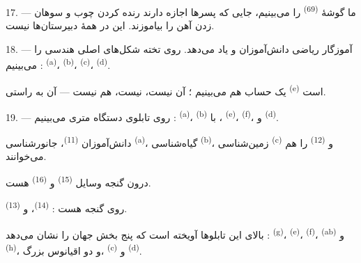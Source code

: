 17. --- ما گوشهٔ   \textsuperscript{(69)}
را می‌بینیم، جایی که پسرها اجازه دارند رنده کردن چوب و سوهان زدن آهن را
بیاموزند. این در همهٔ دبیرستان‌ها نیست.

\VUsaut{5.0mm}
\VUsaut{3.6mm}

18. --- آموزگار ریاضی  دانش‌آموزان  و  یاد می‌دهد. روی تخته شکل‌های اصلی هندسی
را می‌بینیم :  \textsuperscript{(a)}، 
\textsuperscript{(b)}،  \textsuperscript{(c)}،
 \textsuperscript{(d)}.

یک  حساب هم می‌بینیم ؛ آن  نیست،
 نیست،  هم نیست — آن به راستی 
\textsuperscript{(e)} است.

19. --- روی تابلوی دستگاه متری می‌بینیم : 
\textsuperscript{(a)}،  \textsuperscript{(b)} با
،  \textsuperscript{(e)}،
 \textsuperscript{(f)}،  و
 \textsuperscript{(d)}.

دانش‌آموزان  \textsuperscript{(11)}، جانورشناسی
\textsuperscript{(a)}، گیاه‌شناسی \textsuperscript{(b)}، زمین‌شناسی
\textsuperscript{(c)} و  \textsuperscript{(12)} را هم
می‌خوانند.

درون گنجه وسایل  \textsuperscript{(15)} و 
\textsuperscript{(16)} هست.

روی گنجه هست :  \textsuperscript{(14)}،  و
 \textsuperscript{(13)}.

بالای این تابلوها  آویخته است که پنج بخش جهان را نشان
می‌دهد :  \textsuperscript{(g)}، 
\textsuperscript{(e)}،  \textsuperscript{(f)}،
 \textsuperscript{(ab)} و 
\textsuperscript{(h)}، و دو اقیانوس بزرگ، 
\textsuperscript{(c)} و  \textsuperscript{(d)}.

\VUsaut{6.0mm}
\VUfilet{22mm}
